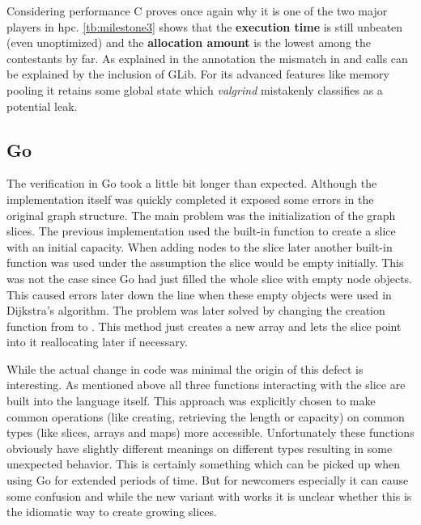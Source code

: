 Considering performance C proves once again why it is one of the two major players in \gls{hpc}. \autoref{tb:milestone3} shows that the \textbf{execution time} is still unbeaten (even unoptimized) and the \textbf{allocation amount} is the lowest among the contestants by far. As explained in the annotation the mismatch in  and  calls can be explained by the inclusion of GLib. For its advanced features like memory pooling it retains some global state which \textit{valgrind} mistakenly classifies as a potential leak.

\subsection{Go}
\label{subsec:Implementation::Verification::Go}

The verification in Go took a little bit longer than expected. Although the implementation itself was quickly completed it exposed some errors in the original graph structure. The main problem was the initialization of the graph slices. The previous implementation used the built-in function  to create a slice with an initial capacity. When adding nodes to the slice later another built-in function  was used under the assumption the slice would be empty initially. This was not the case since Go had just filled the whole slice with empty node objects. This caused errors later down the line when these empty objects were used in Dijkstra's algorithm. The problem was later solved by changing the creation function from  to . This method just creates a new array and lets the slice point into it reallocating later if necessary.

While the actual change in code was minimal the origin of this defect is interesting. As mentioned above all three functions interacting with the slice are built into the language itself. This approach was explicitly chosen to make common operations (like creating, retrieving the length or capacity) on common types (like slices, arrays and maps) more accessible. Unfortunately these functions obviously have slightly different meanings on different types resulting in some unexpected behavior. This is certainly something which can be picked up when using Go for extended periods of time. But for newcomers especially it can cause some confusion and while the new variant with  works it is unclear whether this is the idiomatic way to create growing slices.


